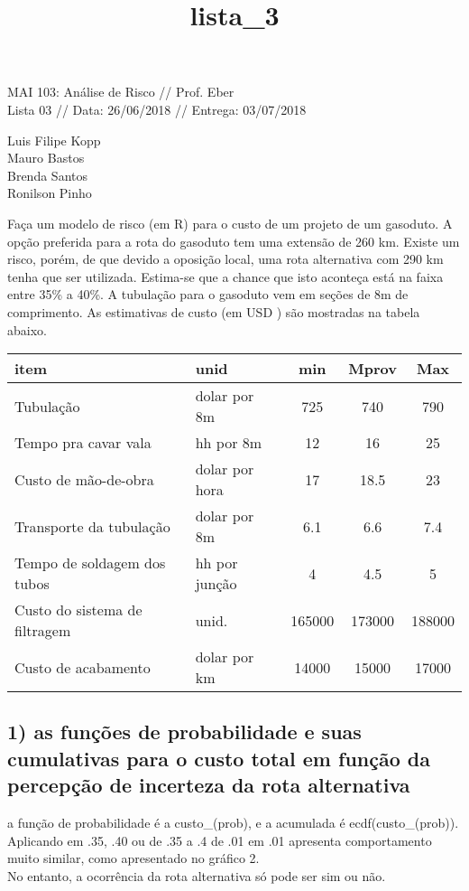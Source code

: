 \documentclass[11pt]{article}
\title{lista\_3}
\begin{document}
    
    
    \maketitle
    
    

    
    MAI 103: Análise de Risco // Prof. Eber\\
Lista 03 // Data: 26/06/2018 // Entrega: 03/07/2018

Luis Filipe Kopp\\
Mauro Bastos\\
Brenda Santos\\
Ronilson Pinho

    Faça um modelo de risco (em R) para o custo de um projeto de um
gasoduto. A opção preferida para a rota do gasoduto tem uma extensão de
260 km. Existe um risco, porém, de que devido a oposição local, uma rota
alternativa com 290 km tenha que ser utilizada. Estima-se que a chance
que isto aconteça está na faixa entre 35\% a 40\%. A tubulação para o
gasoduto vem em seções de 8m de comprimento. As estimativas de custo (em
USD ) são mostradas na tabela abaixo.

    \begin{longtable}[]{@{}llccc@{}}
\toprule
item & unid & min & Mprov & Max\tabularnewline
\midrule
\endhead
Tubulação & dolar por 8m & 725 & 740 & 790\tabularnewline
Tempo pra cavar vala & hh por 8m & 12 & 16 & 25\tabularnewline
Custo de mão-de-obra & dolar por hora & 17 & 18.5 & 23\tabularnewline
Transporte da tubulação & dolar por 8m & 6.1 & 6.6 & 7.4\tabularnewline
Tempo de soldagem dos tubos & hh por junção & 4 & 4.5 & 5\tabularnewline
Custo do sistema de filtragem & unid. & 165000 & 173000 &
188000\tabularnewline
Custo de acabamento & dolar por km & 14000 & 15000 &
17000\tabularnewline
\bottomrule
\end{longtable}

    \subsection{1) as funções de probabilidade e suas cumulativas para o
custo total em função da percepção de incerteza da rota
alternativa}\label{as-funuxe7uxf5es-de-probabilidade-e-suas-cumulativas-para-o-custo-total-em-funuxe7uxe3o-da-percepuxe7uxe3o-de-incerteza-da-rota-alternativa}

    a função de probabilidade é a custo\_(prob), e a acumulada é
ecdf(custo\_(prob)).\\
Aplicando em .35, .40 ou de .35 a .4 de .01 em .01 apresenta
comportamento muito similar, como apresentado no gráfico 2.\\
No entanto, a ocorrência da rota alternativa só pode ser sim ou não.
\end{document}
